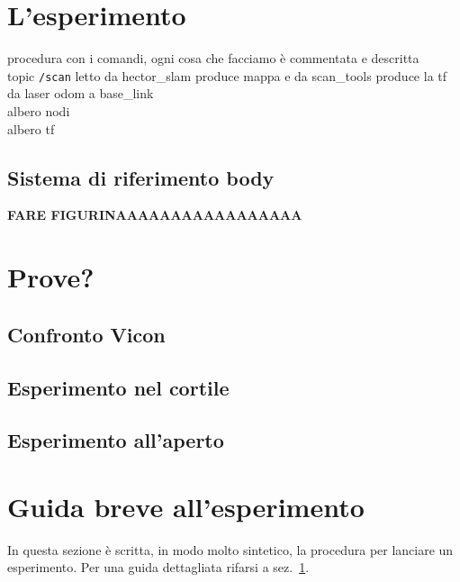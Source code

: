 \newpage
\section{L'esperimento}
\label{sez:L'esperimento}
procedura con i comandi, ogni cosa che facciamo \`e commentata e descritta \\
topic \texttt{/scan} letto da hector\_slam produce mappa e da scan\_tools produce la tf da laser odom a base\_link \\
albero nodi\\
albero tf\\

\subsection{Sistema di riferimento body}
\textbf{FARE FIGURINAAAAAAAAAAAAAAAAA}

\section{Prove?}
\subsection{Confronto Vicon}

\subsection{Esperimento nel cortile}

\subsection{Esperimento all'aperto}



\newpage
\section{Guida breve all'esperimento}
\label{sez: Guida breve all'esperimento}
In questa sezione \`e scritta, in modo molto sintetico, la procedura per lanciare un esperimento. Per una guida dettagliata rifarsi a sez.~\ref{sez:L'esperimento}. 

